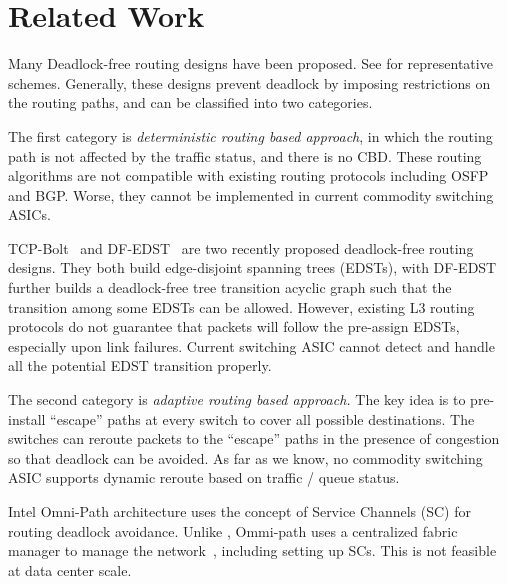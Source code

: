\section{Related Work}\label{sec:related}

 Many Deadlock-free routing designs have been
proposed. See
\cite{dally,duato93,dally93,sancho2004,flich2012survey,lash,wu2003fault,glass,duato2001,domke2011,puente1999,dfedst16}
for representative schemes. Generally, these designs prevent deadlock by
imposing restrictions on the routing paths, and can be classified into two
categories.

The first category is {\em deterministic routing based approach}, in which the
routing path is not affected by the traffic status, and there is no CBD.  These
routing algorithms are not compatible with existing routing protocols including
OSFP and BGP. Worse, they cannot be implemented in current commodity switching
ASICs.

TCP-Bolt~\cite{tcpbolt} and DF-EDST~\cite{dfedst16} are two recently
proposed deadlock-free routing designs. They both build edge-disjoint
spanning trees (EDSTs), with DF-EDST~\cite{dfedst16} further builds a
deadlock-free tree transition acyclic graph such that the transition
among some EDSTs can be allowed. However, existing L3 routing protocols
do not guarantee that packets will follow the pre-assign EDSTs, especially
upon link failures. Current switching ASIC cannot detect and handle all 
the potential EDST transition properly.


The second category is {\em adaptive routing based approach.} The key idea is to
pre-install  ``escape'' paths at every switch to cover all possible
destinations. The switches can reroute packets to the ``escape'' paths in the
presence of congestion so that deadlock can be avoided.  As far as we know, no
commodity switching ASIC supports dynamic reroute based on traffic / queue
status.

 Intel Omni-Path architecture \cite{omnipath} uses the
concept of Service Channels (SC) for routing deadlock avoidance.  Unlike
\sysname{}, Ommi-path uses a centralized fabric manager to manage the
network~\cite{omnipath}, including setting up SCs. This is not feasible at
data center scale.

